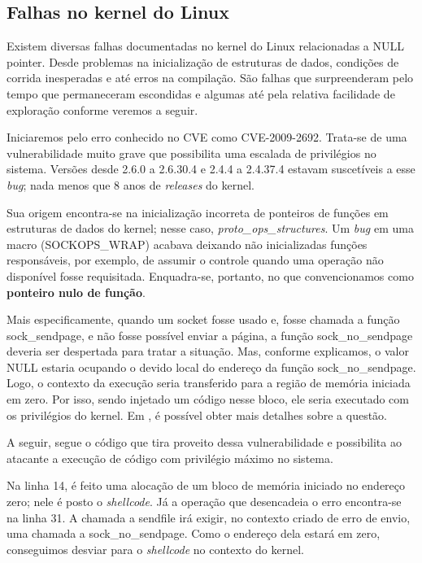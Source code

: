 		
		\subsection{Falhas no kernel do Linux}
		\label{subsec:linux_kernel_vuln}
			Existem diversas falhas documentadas no kernel do Linux relacionadas a NULL pointer.
			Desde problemas na inicialização de estruturas de dados, condições de corrida
			inesperadas e até erros na compilação.		
			São falhas que surpreenderam pelo tempo que permaneceram escondidas e algumas até pela
			relativa facilidade de exploração conforme veremos a seguir.
	
			Iniciaremos pelo erro conhecido no CVE como CVE-2009-2692.
			Trata-se de uma vulnerabilidade muito grave que possibilita uma escalada de privilégios
			no sistema. Versões desde 2.6.0 a 2.6.30.4 e 2.4.4 a 2.4.37.4 estavam suscetíveis
			a esse \textsl{bug}; nada menos que 8 anos de \textsl{releases} do kernel.

			
			Sua origem encontra-se na inicialização incorreta de ponteiros de funções em estruturas
			de dados do kernel; nesse caso, \textsl{proto\_ops\_structures}. 
			Um \textsl{bug} em uma macro (SOCKOPS\_WRAP) acabava deixando não inicializadas
			funções responsáveis, por exemplo, de assumir o controle quando uma operação não disponível fosse
			requisitada. Enquadra-se, portanto, no que convencionamos como \textbf{ponteiro nulo de função}.

			
			Mais especificamente, quando um socket fosse usado e, fosse chamada a função sock\_sendpage,
			e não fosse possível enviar a página, a função sock\_no\_sendpage deveria ser despertada
			para tratar a situação. Mas, conforme explicamos, o valor NULL estaria ocupando o devido
			local do endereço da função sock\_no\_sendpage. Logo, o contexto da execução seria transferido
			para a região de memória iniciada em zero. Por isso, sendo injetado um código nesse bloco,
			ele seria executado com os privilégios do kernel. Em \cite{Tinnes2009}, é possível
			obter mais detalhes	sobre a questão.

	
			A seguir, segue o código que tira proveito dessa vulnerabilidade e possibilita ao atacante
			a execução de código com privilégio máximo no sistema.  
			
			Na linha 14, é feito uma alocação de um bloco de memória iniciado no endereço zero; nele é posto
			o \textsl{shellcode}. Já a operação que desencadeia o erro encontra-se na linha 31.
			A chamada a sendfile irá exigir, no contexto criado de erro de envio, uma chamada 
			a sock\_no\_sendpage.
			Como o endereço dela estará em zero, conseguimos desviar para o \textsl{shellcode} no contexto do kernel.

